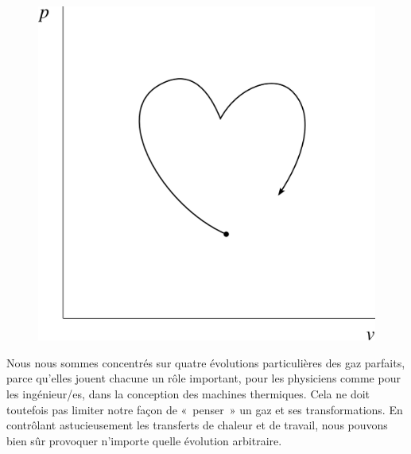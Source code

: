		\begin{figure}
			\begin{center}
				\includegraphics[width=\pvdiagramwidth]{images/pv_coeur.png}
			\end{center}
			\label{fig_gp_pv_coeur}
		\end{figure}
		
		Nous nous sommes concentrés sur quatre évolutions particulières des gaz parfaits, parce qu’elles jouent chacune un rôle important, pour les physiciens comme pour les ingénieur/es, dans la conception des machines thermiques. Cela ne doit toutefois pas limiter notre façon de «~penser~» un gaz et ses transformations. En contrôlant astucieusement les transferts de chaleur et de travail, nous pouvons bien sûr provoquer n’importe quelle évolution arbitraire.
